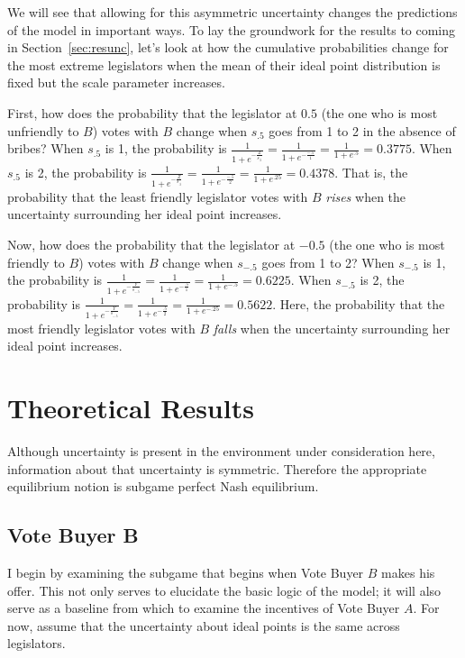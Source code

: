 \documentclass[12pt]{article}
\begin{document}
We will see that allowing for this asymmetric uncertainty changes the predictions of the model in important ways. To lay the groundwork for the results to coming in Section~\ref{sec:resunc}, let's look at how the cumulative probabilities change for the most extreme legislators when the mean of their ideal point distribution is fixed but the scale parameter increases.

First, how does the probability that the legislator at $0.5$ (the one who is most unfriendly to $B$) votes with $B$ change when $s_{.5}$ goes from 1 to 2 in the absence of bribes? When $s_{.5}$ is 1, the probability is $\frac{1}{1+e^{-\frac{Z}{s_{.5}}}} = \frac{1}{1+e^{-\frac{-.5}{1}}} = \frac{1}{1+e^{.5}} = 0.3775$. When $s_{.5}$ is 2, the probability is $\frac{1}{1+e^{-\frac{Z}{s_{.5}}}} = \frac{1}{1+e^{-\frac{-.5}{2}}} = \frac{1}{1+e^{.25}} = 0.4378$. That is, the probability that the least friendly legislator votes with $B$ \textit{rises} when the uncertainty surrounding her ideal point increases.

Now, how does the probability that the legislator at $-0.5$ (the one who is most friendly to $B$) votes with $B$ change when $s_{-.5}$ goes from 1 to 2? When $s_{-.5}$ is 1, the probability is $\frac{1}{1+e^{-\frac{Y}{s_{-.5}}}} = \frac{1}{1+e^{-\frac{.5}{1}}} = \frac{1}{1+e^{-.5}} = 0.6225$. When $s_{-.5}$ is 2, the probability is $\frac{1}{1+e^{-\frac{Y}{s_{-.5}}}} = \frac{1}{1+e^{-\frac{.5}{2}}} = \frac{1}{1+e^{-.25}} = 0.5622$. Here, the probability that the most friendly legislator votes with $B$ \textit{falls} when the uncertainty surrounding her ideal point increases.



\section{Theoretical Results}
\label{sec:res}

Although uncertainty is present in the environment under consideration here, information about that uncertainty is symmetric. Therefore the appropriate equilibrium notion is subgame perfect Nash equilibrium.

\subsection{Vote Buyer B}
\label{sec:resB}

I begin by examining the subgame that begins when Vote Buyer $B$ makes his offer. This not only serves to elucidate the basic logic of the model; it will also serve as a baseline from which to examine the incentives of Vote Buyer $A$. For now, assume that the uncertainty about ideal points is the same across legislators.
\end{document}
